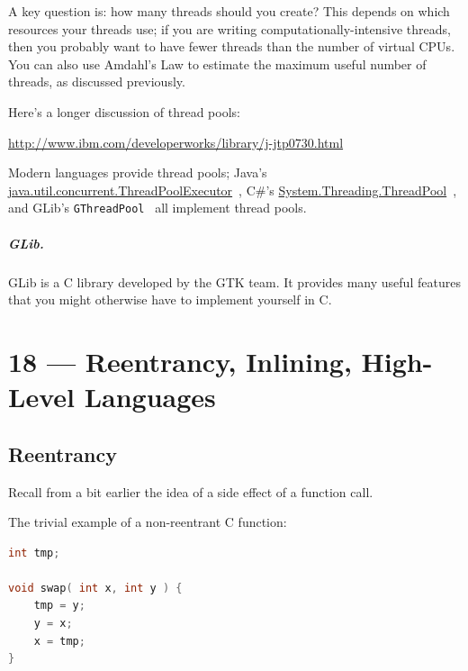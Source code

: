 \documentclass[a4paper]{report}
\begin{document}
A key question is: how many threads should you create?  This depends
on which resources your threads use; if you are writing
computationally-intensive threads, then you probably want to have
fewer threads than the number of virtual CPUs. You can also use
Amdahl's Law to estimate the maximum useful number of threads, as
discussed previously.

Here's a longer discussion of thread pools:

\begin{center}
\url{http://www.ibm.com/developerworks/library/j-jtp0730.html}
\end{center}

Modern languages provide thread pools; Java's
\url{java.util.concurrent.ThreadPoolExecutor}~\cite{java:threadpoolexecutor}, C\#'s
\url{System.Threading.ThreadPool}~\cite{csharp:threadpool}, and GLib's {\tt GThreadPool}~\cite{gnome:threadpool} all implement thread pools. 

\paragraph{GLib.} 
GLib is a C library developed by the GTK team. It provides many useful
features that you might otherwise have to implement yourself in C.









\chapter*{18 --- Reentrancy, Inlining, High-Level Languages}


\section*{Reentrancy}

Recall from a bit earlier the idea of a side effect of a function call. 

The trivial example of a non-reentrant C function:
\begin{lstlisting}[language=C]
int tmp;

void swap( int x, int y ) {
    tmp = y;
    y = x;
    x = tmp;
}
\end{lstlisting}
\end{document}
